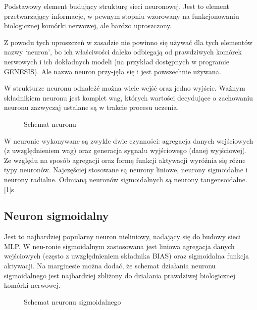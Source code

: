 \documentclass{article}
\begin{document}
Podstawowy element budujący strukturę sieci neuronowej. Jest to element przetwarzający
informacje, w pewnym stopniu wzorowany na funkcjonowaniu biologicznej komórki nerwowej,
ale bardzo uproszczony.

Z powodu tych uproszczeń w  zasadzie nie powinno się używać dla tych elementów nazwy ‘neuron’,
bo ich właściwości daleko odbiegają od prawdziwych komórek nerwowych i ich dokładnych modeli
(na przykład dostępnych w programie GENESIS). Ale nazwa neuron przy-jęła się i jest
powszechnie używana.

W strukturze neuronu odnaleźć można wiele wejść oraz jedno wyjście. Ważnym składnikiem
neuronu jest komplet wag, których wartości decydujące o zachowaniu neuronu zazwyczaj
ustalane są w trakcie procesu uczenia.

\begin{figure}[h]
  \centering
  \caption{Schemat neuronu}
\end{figure}

W  neuronie wykonywane są zwykle dwie czynności: agregacja danych wejściowych
(z  uwzględnieniem  wag) oraz generacja sygnału wyjściowego (danej wyjściowej).
Ze względu na sposób agregacji oraz formę funkcji aktywacji wyróżnia się różne typy
neuronów. Najczęściej stosowane są neurony liniowe, neurony sigmoidalne i neurony radialne.
Odmianą neuronów sigmoidalnych są neurony tangensoidalne.[1]s

\subsection{Neuron sigmoidalny}

Jest to najbardziej popularny neuron nieliniowy, nadający się do budowy sieci MLP.
W neu-ronie sigmoidalnym zastosowana jest liniowa agregacja danych wejściowych
(często z  uwzględnieniem składnika BIAS) oraz sigmoidalna funkcja aktywacji.
Na marginesie można dodać, że schemat działania neuronu sigmoidalnego jest najbardziej
zbliżony do działania prawdziwej biologicznej komórki nerwowej.

\begin{figure}[h]
  \centering
  \caption{Schemat neuronu sigmoidalnego}
\end{figure}
\end{document}
